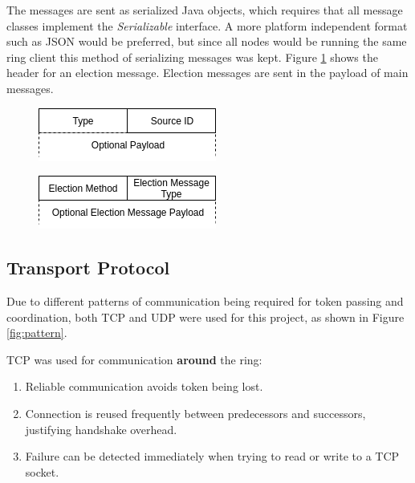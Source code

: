 \documentclass[12pt]{article}
\begin{document}
The messages are sent as serialized Java objects, which requires that all message classes implement the \emph{Serializable} interface. A more platform independent format such as JSON would be preferred, but since all nodes would be running the same ring client this method of serializing messages was kept. Figure \ref{fig:elecmsg} shows the header for an election message. Election messages are sent in the payload of main messages.

\begin{figure}[!ht]
\centering
\begin{minipage}{.5\textwidth}
  \centering
  \includegraphics[width=.8\linewidth]{images/mainmsg}
  \label{fig:mainmsg}
\end{minipage}%
\begin{minipage}{.5\textwidth}
  \centering
  \includegraphics[width=.8\linewidth]{images/elecmsg}
  \label{fig:elecmsg}
\end{minipage}
\end{figure}

\subsection{Transport Protocol}

Due to different patterns of communication being required for token passing and coordination, both TCP and UDP were used for this project, as shown in Figure \ref{fig:pattern}.

\noindent \linebreak TCP was used for communication \textbf{around} the ring:
\begin{enumerate}
    \item Reliable communication avoids token being lost.
    \item Connection is reused frequently between predecessors and successors, justifying handshake overhead.
    \item Failure can be detected immediately when trying to read or write to a TCP socket.
\end{enumerate}
\end{document}
